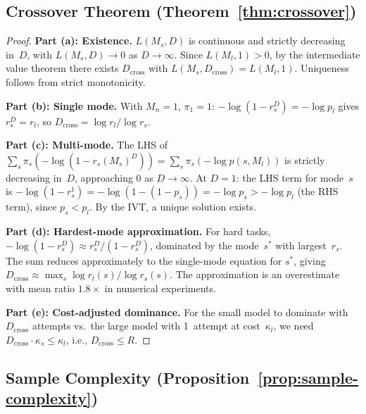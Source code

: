 \documentclass[twoside,11pt]{article}
\newcommand{\Mn}{M_n}
\newcommand{\Dcross}{D_{\mathrm{cross}}}
\begin{document}
\subsection{Crossover Theorem (Theorem~\ref{thm:crossover})}
\label{app:crossover}

\begin{proof}
\noindent\textbf{Part (a): Existence.}
$L(M_s, D)$ is continuous and strictly decreasing in~$D$, with $L(M_s, D) \to 0$ as $D \to \infty$.
Since $L(M_l, 1) > 0$, by the intermediate value theorem there exists $\Dcross$ with $L(M_s, \Dcross) = L(M_l, 1)$.
Uniqueness follows from strict monotonicity.

\noindent\textbf{Part (b): Single mode.}
With $\Mn = 1$, $\pi_1 = 1$:
$-\log(1 - r_s^D) = -\log p_l$ gives $r_s^D = r_l$, so $\Dcross = \log r_l / \log r_s$.

\noindent\textbf{Part (c): Multi-mode.}
The LHS of $\sum_s \pi_s(-\log(1-r_s(M_s)^D)) = \sum_s \pi_s(-\log p(s,M_l))$ is strictly decreasing in~$D$, approaching $0$ as $D \to \infty$.
At $D = 1$: the LHS term for mode~$s$ is $-\log(1 - r_s^1) = -\log(1-(1-p_s)) = -\log p_s > -\log p_l$ (the RHS term), since $p_s < p_l$.
By the IVT, a unique solution exists.

\noindent\textbf{Part (d): Hardest-mode approximation.}
For hard tasks, $-\log(1-r_s^D) \approx r_s^D/(1-r_s^D)$, dominated by the mode~$s^*$ with largest~$r_s$.
The sum reduces approximately to the single-mode equation for $s^*$, giving $\Dcross \approx \max_s \log r_l(s)/\log r_s(s)$.
The approximation is an overestimate with mean ratio $1.8\times$ in numerical experiments.

\noindent\textbf{Part (e): Cost-adjusted dominance.}
For the small model to dominate with $\Dcross$ attempts vs.\ the large model with 1~attempt at cost~$\kappa_l$, we need $\Dcross \cdot \kappa_s \le \kappa_l$, i.e., $\Dcross \le R$.
\end{proof}

\subsection{Sample Complexity (Proposition~\ref{prop:sample-complexity})}
\label{app:sample-complexity}
\end{document}
